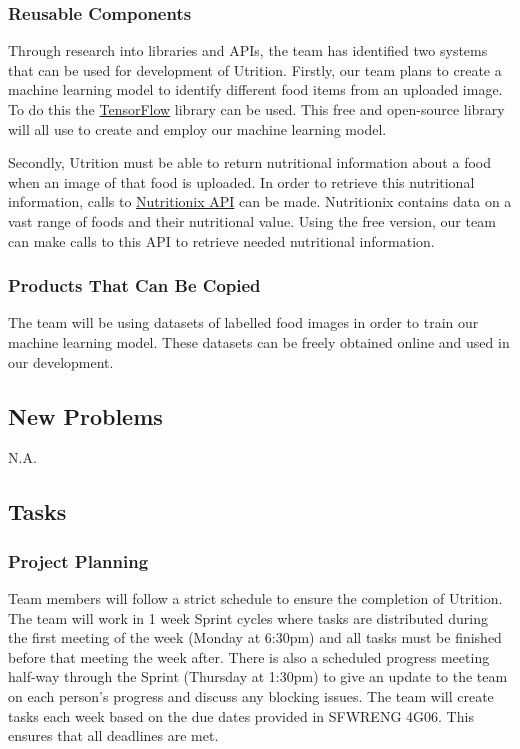 \documentclass[12pt]{article}
\begin{document}
\subsubsection{Reusable Components}
Through research into libraries and APIs, the team has identified two systems that can be used for development of Utrition. Firstly, our team plans to create a machine learning model to identify different food items from an uploaded image. To do this the \href{https://www.tensorflow.org/}{TensorFlow} library can be used. This free and open-source library will all use to create and employ our machine learning model.

Secondly, Utrition must be able to return nutritional information about a food when an image of that food is uploaded. In order to retrieve this nutritional information, calls to \href{https://www.nutritionix.com/business/api}{Nutritionix API} can be made. Nutritionix contains data on a vast range of foods and their nutritional value. Using the free version, our team can make calls to this API to retrieve needed nutritional information.

\subsubsection{Products That Can Be Copied}
The team will be using datasets of labelled food images in order to train our machine learning model. These datasets can be freely obtained online and used in our development.

\subsection{New Problems}
N.A.

\subsection{Tasks}
\subsubsection{Project Planning}
Team members will follow a strict schedule to ensure the completion of Utrition. The team will work in 1 week Sprint cycles where tasks are distributed during the first meeting of the week (Monday at 6:30pm) and all tasks must be finished before that meeting the week after. There is also a scheduled progress meeting half-way through the Sprint (Thursday at 1:30pm) to give an update to the team on each person's progress and discuss any blocking issues. The team will create tasks each week based on the due dates provided in SFWRENG 4G06. This ensures that all deadlines are met.
\end{document}
